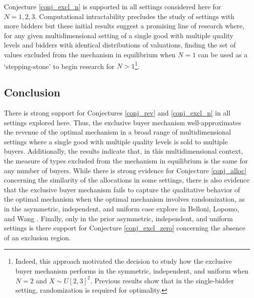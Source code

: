 \documentclass{article}
\begin{document}
Conjecture \ref{conj_excl_n} is supported in all settings considered here for $N=1,2,3$. Computational intractability precludes the study of settings with more bidders but these initial results suggest a promising line of research where, for any given multidimensional setting of a single good with multiple quality levels and bidders with identical distributions of valuations, finding the set of values excluded from the mechanism in equilibrium when $N=1$ can be used as a `stepping-stone' to begin research for $N>1$\footnote{Indeed, this approach motivated the decision to study how the exclusive buyer mechanism performs in the symmetric, independent, and uniform when $N=2$ and $X \sim U[2,3]^2$. Previous results \autocite{pavlov2011optimal} show that in the single-bidder setting, randomization is required for optimality.}. 











\subsection{Conclusion}

There is strong support for Conjectures \ref{conj_rev} and \ref{conj_excl_n} in all settings explored here. Thus, the exclusive buyer mechanism well-approximates the revenue of the optimal mechanism in a broad range of multidimensional settings where a single good with multiple quality levels is sold to multiple buyers. Additionally, the results indicate that, in this multidimensional context, the measure of types excluded from the mechanism in equilibrium is the same for any number of buyers. While there is strong evidence for Conjecture \ref{conj_alloc} concerning the similarity of the allocations in some settings, there is also evidence that the exclusive buyer mechanism fails to capture the qualitative behavior of the optimal mechanism when the optimal mechanism involves randomization, as in the asymmetric, independent, and uniform case explore in Belloni, Lopomo, and Wang \autocite*{belloni2010multidimensional}. Finally, only in the prior asymmetric, independent, and uniform settings is there support for Conjecture \ref{conj_excl_zero} concerning the absence of an exclusion region.
\end{document}
